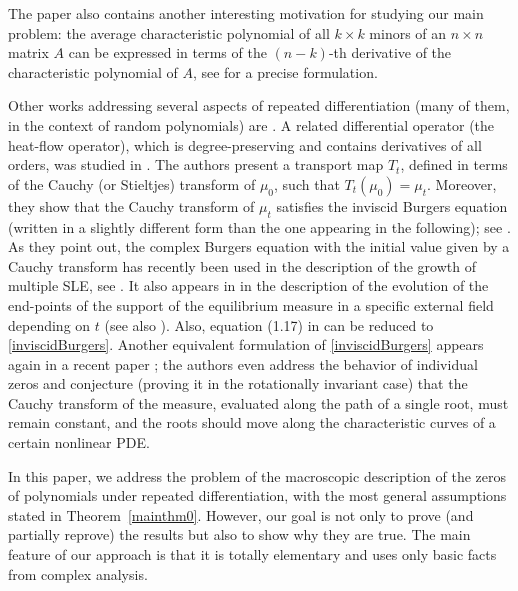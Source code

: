 \documentclass[reqno,11pt]{amsart}
\theoremstyle{plain}
\theoremstyle{definition}
\theoremstyle{remark}
\numberwithin{equation}{section}
\numberwithin{equation}{section}
\begin{document}
The paper \cite{MR4408504} also contains another interesting motivation for studying our main problem: the average characteristic polynomial of all $k\times k$ minors of an $n\times n$ matrix $A$ can be expressed in terms of the $(n-k)$-th derivative of the characteristic polynomial of $A$, see \cite[Lemma 1.17]{MR4408504} for a precise formulation.

Other works addressing several aspects of repeated differentiation (many of them, in the context of random polynomials) are \cite{angst2023sure, MR4474893, campbell2023fractional, galligo2022modeling, MR4447137, kabluchko2022repeated, MR4458083}. A related differential operator (the heat-flow operator), which is degree-preserving and contains derivatives of all orders, was studied in \cite{kabluchko2023heat}. The authors present a transport map $T_t$, defined in terms of the Cauchy (or Stieltjes) transform of $\mu_0$, such that $T_t(\mu_0)=\mu_t$. Moreover, they show that the Cauchy transform of $\mu_t$ satisfies the inviscid Burgers equation (written in a slightly different form than the one appearing in the following); see \cite[Eq. (5.4)]{kabluchko2023heat}. As they point out, the complex Burgers equation with the initial value given by a Cauchy transform has recently been used in the description of the growth of multiple SLE, see \cite{MR3573689, MR3773856, MR4259446}. It also appears in \cite{MR2262808} in the description of the evolution of the end-points of the support of the equilibrium measure in a specific external field depending on $t$ (see also \cite{MR3302630}). Also, equation (1.17) in \cite{ShlyakhtenkoTao21} can be reduced to \eqref{inviscidBurgers}. 
Another equivalent formulation of \eqref{inviscidBurgers} appears again in a recent paper \cite{kabluchko2023fractional}; the authors even address the behavior of individual zeros and conjecture (proving it in the rotationally invariant case) that the Cauchy transform of the measure, evaluated along the path of a single root, must remain constant, and the roots should move along the characteristic curves of a certain nonlinear PDE. 

In this paper, we address the problem of the macroscopic description of the zeros of polynomials under repeated differentiation, with the most general assumptions stated in Theorem~\ref{mainthm0}. However, our goal is not only to prove (and partially reprove) the results but also to show why they are true. The main feature of our approach is that it is totally elementary and uses only basic facts from complex analysis.
\end{document}
